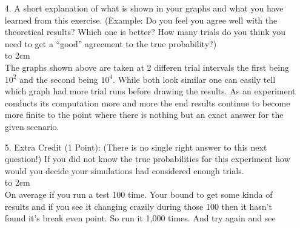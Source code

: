 \documentclass[a4paper]{article}
\newcommand\tab[1][0.5cm]{\hspace*{#1}}
\begin{document}
\begin{itemize}
\begin{itemize}
    \end{itemize}
    \item[4.] A short explanation of what is shown in your graphs and what you have learned from this exercise. (Example:  Do you feel you agree well with the theoretical results?  Which one is better?  How many trials do you think you need to get a “good” agreement to the true probability?) \\
    \hbox to 2cm{} \\ 
    \tab The graphs shown above are taken at 2 differen trial intervals the first being $10^2$ and the second being $10^4$. While both look similar one can easily tell which graph had more trial runs before drawing the results. As an experiment conducts its computation more and more the end results continue to become more finite to the point where there is nothing but an exact answer for the given scenario. 
    \item[5.] Extra Credit (1 Point): (There is no single right answer to this next question!) If you did not know the true probabilities for this experiment how would you decide your simulations had considered enough trials. \\
    \hbox to 2cm{} \\
    \tab On average if you run a test 100 time. Your bound to get some kinda of results and if you see it changing crazily during those 100 then it hasn’t found it’s break even point. So run it 1,000 times. And try again and see 
\end{itemize}
  
\end{document}
